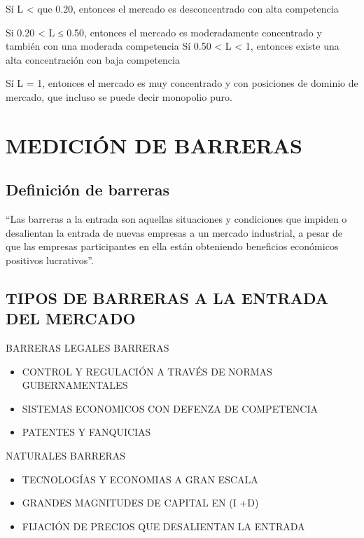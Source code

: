 \documentclass[
  letterpaper,
  DIV=11,
  numbers=noendperiod]{scrartcl}
\begin{document}
Sí L \textless{} que 0.20, entonces el mercado es desconcentrado con
alta competencia

Si 0.20 \textless{} L ≤ 0.50, entonces el mercado es moderadamente
concentrado y también con una moderada competencia Sí 0.50 \textless{} L
\textless{} 1, entonces existe una alta concentración con baja
competencia

Sí L = 1, entonces el mercado es muy concentrado y con posiciones de
dominio de mercado, que incluso se puede decir monopolio puro.

\hypertarget{mediciuxf3n-de-barreras}{%
\section{MEDICIÓN DE BARRERAS}\label{mediciuxf3n-de-barreras}}

\hypertarget{definiciuxf3n-de-barreras}{%
\subsection{Definición de barreras}\label{definiciuxf3n-de-barreras}}

``Las barreras a la entrada son aquellas situaciones y condiciones que
impiden o desalientan la entrada de nuevas empresas a un mercado
industrial, a pesar de que las empresas participantes en ella están
obteniendo beneficios económicos positivos lucrativos''.

\hypertarget{tipos-de-barreras-a-la-entrada-del-mercado}{%
\subsection{TIPOS DE BARRERAS A LA ENTRADA DEL
MERCADO}\label{tipos-de-barreras-a-la-entrada-del-mercado}}

BARRERAS LEGALES BARRERAS

\begin{itemize}
\item
  CONTROL Y REGULACIÓN A TRAVÉS DE NORMAS GUBERNAMENTALES
\item
  SISTEMAS ECONOMICOS CON DEFENZA DE COMPETENCIA
\item
  PATENTES Y FANQUICIAS
\end{itemize}

NATURALES BARRERAS

\begin{itemize}
\item
  TECNOLOGÍAS Y ECONOMIAS A GRAN ESCALA
\item
  GRANDES MAGNITUDES DE CAPITAL EN (I +D)
\item
  FIJACIÓN DE PRECIOS QUE DESALIENTAN LA ENTRADA
\end{itemize}
\end{document}
